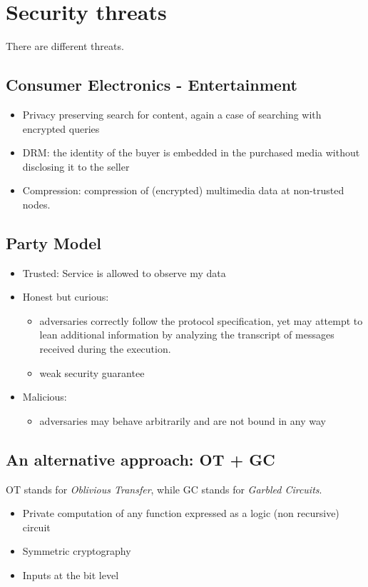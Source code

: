 \chapter{Security threats}

There are different threats.

\section{Consumer Electronics - Entertainment}
\begin{itemize}
	\item Privacy preserving search for content, again a case of searching with 
	encrypted queries
	\item DRM: the identity of the buyer is embedded in the purchased media 
	without disclosing it to the seller
	\item Compression: compression of (encrypted) multimedia data at non-trusted 
	nodes.
\end{itemize}

\section{Party Model}
\begin{itemize}
	\item Trusted: Service is allowed to observe my data
	\item Honest but curious:
	\begin{itemize}
		\item adversaries correctly follow the protocol specification, yet may 
		attempt to lean additional information by analyzing the transcript of 
		messages received during the execution.
		\item weak security guarantee
	\end{itemize}
	\item Malicious:
	\begin{itemize}
		\item adversaries may behave arbitrarily and are not bound in any way 
	\end{itemize}
\end{itemize}

\section{An alternative approach: OT + GC}
OT stands for \textit{Oblivious Transfer}, while GC stands for \textit{Garbled 
Circuits}.
\begin{itemize}
	\item Private computation of any function expressed as a logic (non 
	recursive) circuit
	\item Symmetric cryptography
	\item Inputs at the bit level
\end{itemize}